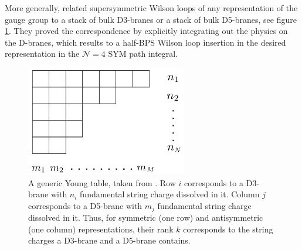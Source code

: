 More generally, \cite{Gomis:2006sb} related supersymmetric Wilson loops of any representation of the gauge group 
to a stack of bulk D3-branes or a stack of bulk D5-branes, see figure \ref{fig:YoungTable}.
They proved the correspondence by explicitly integrating out the physics on the D-branes, 
which results to a half-BPS Wilson loop insertion in the desired representation in the $\mathcal{N}=4$ SYM path integral.

\begin{figure}[t]
\begin{center}
\includegraphics[width=7cm]{Images/YoungTable.png}
\end{center}
\caption{\label{fig:YoungTable} A generic Young table, taken from \cite{Gomis:2006sb}. 
Row $i$ corresponds to a D3-brane with $n_i$ fundamental string charge dissolved in it.
Column $j$ corresponds to a D5-brane with $m_j$ fundamental string charge dissolved in it.
Thus, for symmetric (one row) and antisymmetric (one column) representations,
their rank $k$ corresponds to the string charges a D3-brane and a D5-brane contains.}
\end{figure}


